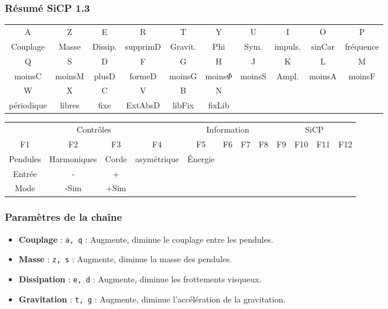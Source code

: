 \subsubsection{Résumé SiCP 1.3}
\begin{center}
\begin{tabular}{cccccccccc}
\sf A &\sf Z &\sf E &\sf R &\sf T &\sf Y &\sf U &\sf I &\sf O &\sf P \\
Couplage & Masse & Dissip. & supprimD & Gravit. & Phi & Sym. & impuls. & sinCar & fréquence \\
\sf Q &\sf S &\sf D &\sf F &\sf G &\sf H &\sf J &\sf K &\sf L &\sf M \\
moinsC & moinsM & plusD & formeD & moinsG & moins$\Phi$ & moinsS & Ampl. & moinsA & moinsF \\
\sf W &\sf X &\sf C &\sf V &\sf B &\sf N &  &  &  & \\
périodique & libres & fixe & ExtAbsD & libFix & fixLib &  &  &  & \\
\end{tabular}
\end{center}
\vspace{.3cm}
\begin{center}
\begin{tabular}{ccccc ccccc cc}
\multicolumn{4}{|c|}{Contrôles} & \multicolumn{4}{c}{Information} & \multicolumn{4}{|c|}{SiCP}\\
\sf F1 &\sf F2 &\sf F3 &\sf F4 &\sf F5 &\sf F6 &\sf F7 &\sf F8 &\sf F9 &\sf F10 &\sf F11 &\sf F12 \\
Pendules & Harmoniques & Corde & asymétrique & Énergie &  &  &   &  &  &  &  \\
\sf Entrée &\sf - &\sf + &\sf  &\sf  &\sf  &\sf  &\sf  &\sf  &\sf  \\
Mode & -Sim & +Sim & & & & & & & \\
\end{tabular}
\end{center}
%
\subsubsection{Paramètres de la chaîne}
%
\begin{itemize}[label=, leftmargin=2cm]
\item {\bf Couplage} : \texttt{a, q} : Augmente, diminue le couplage entre les pendules.
\item {\bf Masse} : \texttt{z, s} :  Augmente, diminue la masse des pendules.
\item {\bf Dissipation} : \texttt{e, d} :  Augmente, diminue les frottements visqueux.
\item {\bf Gravitation} : \texttt{t, g} :  Augmente, diminue l'accélération de la gravitation.
\end{itemize}
%
